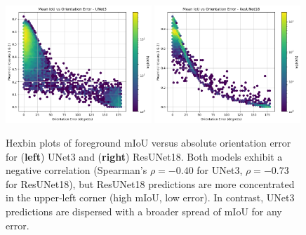 \begin{figure}[htbp]
    \centering
    \includegraphics[width=0.49\textwidth]{figures/results/4 - correlation/UNet3 mIoU vs Orientation Error.png}
    \hfill
    \includegraphics[width=0.49\textwidth]{figures/results/4 - correlation/ResUNet18 mIoU vs Orientation Error.png}
    \caption{
        Hexbin plots of foreground mIoU versus absolute orientation error for (\textbf{left}) UNet3 and (\textbf{right}) ResUNet18.
        Both models exhibit a negative correlation (Spearman’s $\rho = -0.40$ for UNet3, $\rho = -0.73$ for ResUNet18), but ResUNet18 predictions are more concentrated in the upper‑left corner (high mIoU, low error).
        In contrast, UNet3 predictions are dispersed with a broader spread of mIoU for any error.
    }
    \label{fig:iou_vs_orientation_error}
\end{figure}